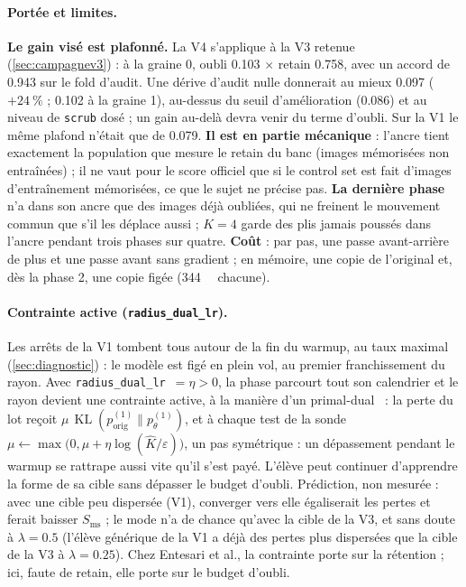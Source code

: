 \documentclass[11pt,a4paper]{article}
\newcommand{\KL}{\operatorname{KL}}
\newcommand{\orig}{\mathrm{orig}}
\newcommand{\code}[1]{\texttt{#1}}
\begin{document}
\paragraph{Portée et limites.} \textbf{Le gain visé est plafonné.} La V4 s'applique à la V3 retenue
(\cref{sec:campagnev3}) : à la graine 0, oubli \num{0.103} $\times$ retain \num{0.758}, avec un accord de
\num{0.943} sur le fold d'audit. Une dérive d'audit nulle donnerait au mieux \num{0.097}
($+\SI{24}{\percent}$ ; \num{0.102} à la graine 1), au-dessus du seuil d'amélioration (\num{0.086}) et
au niveau de \code{scrub} dosé ; un gain au-delà devra venir du terme d'oubli. Sur la V1 le même
plafond n'était que de \num{0.079}. \textbf{Il est en partie
mécanique} : l'ancre tient exactement la population que mesure le retain du banc (images
mémorisées non entraînées) ; il ne vaut pour le score officiel que si le control set est fait
d'images d'entraînement mémorisées, ce que le sujet ne précise pas. \textbf{La dernière phase} n'a
dans son ancre que des images déjà oubliées, qui ne freinent le mouvement commun que s'il les
déplace aussi ; $K=4$ garde des plis jamais poussés dans l'ancre pendant trois phases sur quatre.
\textbf{Coût} : par pas, une passe avant-arrière de plus et une passe avant sans gradient ; en
mémoire, une copie de l'original et, dès la phase 2, une copie figée (\SI{344}{\mega\byte} chacune).

\paragraph{Contrainte active (\code{radius\_dual\_lr}).} Les arrêts de la V1 tombent tous autour de
la fin du warmup, au taux maximal (\cref{sec:diagnostic}) : le modèle est figé en plein vol, au
premier franchissement du rayon. Avec \code{radius\_dual\_lr}~$=\eta>0$, la phase parcourt tout son
calendrier et le rayon devient une contrainte active, à la manière d'un
primal-dual~\cite{entesari2025constrained} : la perte du lot reçoit
$\mu\,\KL(p^{(1)}_\orig\|p^{(1)}_\theta)$, et à chaque test de la sonde
$\mu\leftarrow\max\bigl(0,\mu+\eta\log(\hat K/\varepsilon)\bigr)$, un pas symétrique : un
dépassement pendant le warmup se rattrape aussi vite qu'il s'est payé. L'élève peut continuer
d'apprendre la forme de sa cible sans dépasser le budget d'oubli. Prédiction, non mesurée : avec
une cible peu dispersée (V1), converger vers elle égaliserait les pertes et ferait baisser
$S_{\text{ms}}$ ; le mode n'a de chance qu'avec la cible de la V3, et sans doute à $\lambda=\num{0.5}$
(l'élève générique de la V1 a déjà des pertes plus dispersées que la cible de la V3 à $\lambda=\num{0.25}$).
Chez Entesari et al., la contrainte porte sur la rétention ; ici, faute de retain, elle porte sur le
budget d'oubli.
\end{document}

